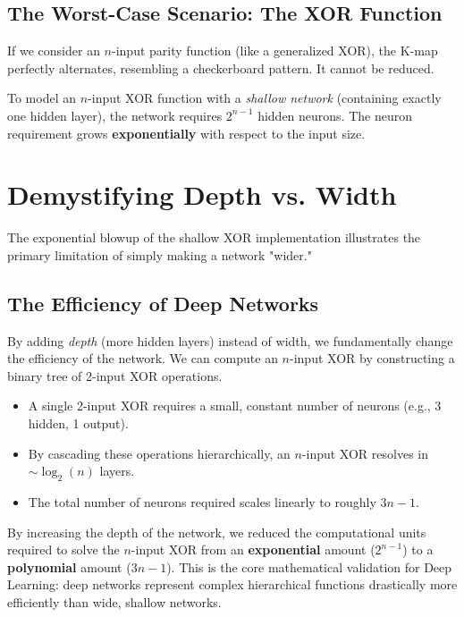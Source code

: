 \subsection{The Worst-Case Scenario: The XOR Function}

If we consider an $n$-input parity function (like a generalized XOR), the K-map perfectly alternates, resembling a checkerboard pattern. It cannot be reduced. 

\begin{theorembox}
To model an $n$-input XOR function with a \textit{shallow network} (containing exactly one hidden layer), the network requires $2^{n-1}$ hidden neurons. The neuron requirement grows \textbf{exponentially} with respect to the input size.
\end{theorembox}


\section{Demystifying Depth vs. Width}

The exponential blowup of the shallow XOR implementation illustrates the primary limitation of simply making a network "wider." 

\subsection{The Efficiency of Deep Networks}

By adding \textit{depth} (more hidden layers) instead of width, we fundamentally change the efficiency of the network. We can compute an $n$-input XOR by constructing a binary tree of 2-input XOR operations.

\begin{itemize}
    \item A single 2-input XOR requires a small, constant number of neurons (e.g., 3 hidden, 1 output).
    \item By cascading these operations hierarchically, an $n$-input XOR resolves in $\sim \log_2(n)$ layers.
    \item The total number of neurons required scales linearly to roughly $3n - 1$.
\end{itemize}

\begin{bluebox}
By increasing the depth of the network, we reduced the computational units required to solve the $n$-input XOR from an \textbf{exponential} amount ($2^{n-1}$) to a \textbf{polynomial} amount ($3n-1$). This is the core mathematical validation for Deep Learning: deep networks represent complex hierarchical functions drastically more efficiently than wide, shallow networks.
\end{bluebox}

